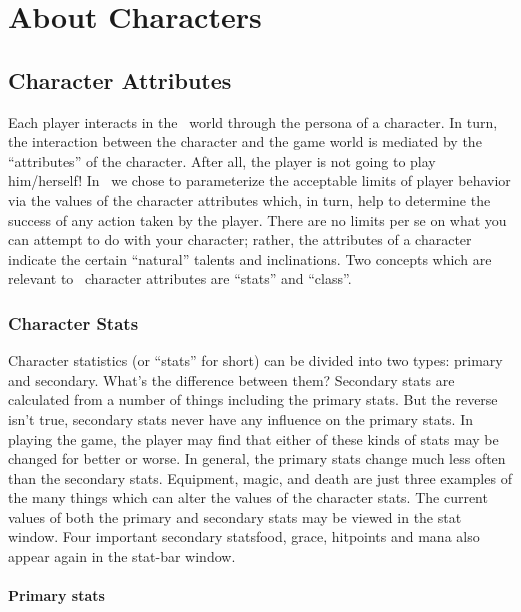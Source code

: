 
\chapter{About Characters}

\section{Character Attributes}\label{sec:char_attr}

Each player interacts in the \cf\ world through the persona of a
character. In turn, the interaction between the character and
the game world is mediated by the ``attributes'' of the character.
After all, the player is not going to play him/herself! In \cf\ we
chose to parameterize the acceptable limits of player behavior
via the values of the character attributes which, in turn, help
to determine the success of any action taken by the player. There
are no limits per se on what you can attempt to
do with your character; rather, the attributes of a character
indicate the certain ``natural'' talents and inclinations.
Two concepts which are relevant to \cf\ character attributes are
``stats'' and ``class''.

\subsection{Character Stats}

Character statistics (or ``stats'' for short) can be
divided into two types: primary and secondary. What's the difference
between them? Secondary stats are calculated from a number of things
including the primary stats. But the reverse isn't true, secondary
stats never have any influence on the primary stats. In playing the game, the
player may find that either of these kinds of stats may be changed
for better or worse. In general, the primary stats change much less
often than the secondary stats. Equipment, magic, and death are
just three examples of the many things which can alter the values of
the character stats. The current values of both the primary and
secondary stats may be viewed in the stat window. Four important
secondary stats\emdash food, grace, hitpoints and mana also appear
again in the stat-bar window.


\subsubsection{Primary stats}

